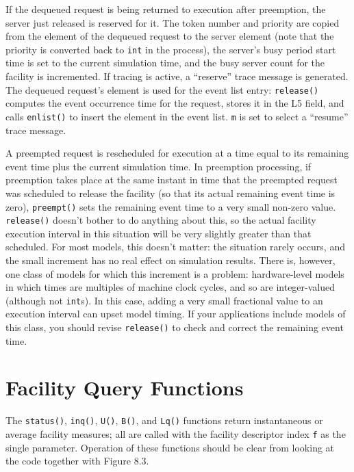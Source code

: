 If the dequeued request is being returned to execution after preemption,
the server just released is reserved for it. The token number and priority are
copied from the element of the dequeued request to the server element (note
that the priority is converted back to \texttt{int} in the process), the server's busy
period start time is set to the current simulation time, and the busy server
count for the facility is incremented. If tracing is active, a ``reserve'' trace
message is generated. The dequeued request's element is used for the event
list entry: \texttt{release()} computes the event occurrence time for the request,
stores it in the L5 field, and calls \texttt{enlist()} to insert the element in the
event list. \texttt{m} is set to select a ``resume'' trace message.

A preempted request is rescheduled for execution at a time equal to its
remaining event time plus the current simulation time. In preemption
processing, if preemption takes place at the same instant in time that the
preempted request was scheduled to release the facility (so that its actual
remaining event time is zero), \texttt{preempt()} sets the remaining event time to a
very small non-zero value. \texttt{release()} doesn't bother to do anything about
this, so the actual facility execution interval in this situation will be very
slightly greater than that scheduled. For most models, this doesn't matter:
the situation rarely occurs, and the small increment has no real effect on
simulation results. There is, however, one class of models for which this
increment is a problem: hardware-level models in which times are
multiples of machine clock cycles, and so are integer-valued (although not
\texttt{int}s). In this case, adding a very small fractional value to an execution
interval can upset model timing. If your applications include models of this
class, you should revise \texttt{release()} to check and correct the remaining event
time.

\section{Facility Query Functions}

The \texttt{status()}, \texttt{inq()}, \texttt{U()}, \texttt{B()}, and \texttt{Lq()} functions return instantaneous
or average facility measures; all are called with the facility
descriptor index \texttt{f} as the single parameter. Operation of these functions
should be clear from looking at the code together with Figure 8.3.

